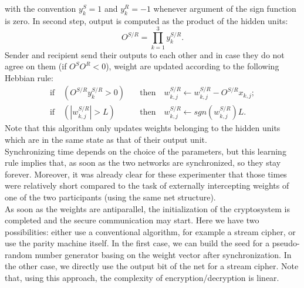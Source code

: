 \documentclass[%
    corpo=11pt,
    twoside,
    stile=classica,
    oldstyle,
    autoretitolo,
    tipotesi=magistrale,
    greek,
    evenboxes,
    english
]{toptesi}
\begin{document}
with the convention $y_k^S = 1$ and $y_k^R = -1$ whenever argument of the sign function is zero. In second step, output is computed as the product of the hidden units:
\begin{equation}
O^{S/R} = \prod_{k=1}^{3}y_k^{S/R}.
\end{equation} 
Sender and recipient send their outputs to each other and in case they do not agree on them (if $O^SO^R<0$), weight are updated according to the following Hebbian rule:
\begin{align}
\text{if} \quad \left(O^{S/R}y_k^{S/R}>0\right) \quad &\text{then} \quad w_{k,j}^{S/R} \leftarrow w_{k,j}^{S/R} -O^{S/R} x_{k,j}; \nonumber \\
\text{if} \quad \left(|w_{k,j}^{S/R}|>L\right) \quad &\text{then} \quad w_{k,j}^{S/R} \leftarrow sgn\left(w_{k,j}^{S/R}\right)L.
\label{hebblearn}
\end{align}
Note that this algorithm only updates weights belonging to the hidden units which are in the same state as that of their output unit. \\
Synchronizing time depends on the choice of the parameters, but this learning rule implies that, as soon as the two networks are synchronized, so they stay forever. Moreover, it was already clear for these experimenter that those times were relatively short compared to the task of externally intercepting weights of one of the two participants (using the same net structure). \\
As soon as the weights are antiparallel, the initialization of the cryptosystem is completed and the secure communication may start. Here we have two possibilities: either use a conventional algorithm, for example a stream cipher, or use the parity machine itself. In the first case, we can build the seed for a pseudo-random number generator basing on the weight vector after synchronization. In the other case, we directly use the output bit of the net for a stream cipher. Note that, using this approach, the complexity of encryption/decryption is linear. 
\end{document}
